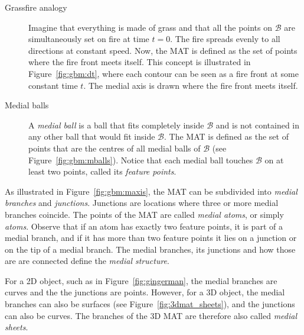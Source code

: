 \begin{description}
	\item[Grassfire analogy]
	Imagine that everything is made of grass and that all the points on $\mathcal{B}$ are simultaneously set on fire at time $t=0$. 
	The fire spreads evenly to all directions at constant speed. 
	Now, the MAT is defined as the set of points where the fire front meets itself. 
	This concept is illustrated in Figure~\ref{fig:gbm:dt}, where each contour can be seen as a fire front at some constant time $t$. The medial axis is drawn where the fire front meets itself.
	\item[Medial balls]
	A \emph{medial ball} is a ball that fits completely inside $\mathcal{B}$ and is not contained in any other ball that would fit inside $\mathcal{B}$. 
	The MAT is defined as the set of points that are the centres of all medial balls of $\mathcal{B}$ (see Figure~\ref{fig:gbm:mballs}). 
	Notice that each medial ball touches $\mathcal{B}$ on at least two points, called its \emph{feature points}. 
\end{description}

As illustrated in Figure~\ref{fig:gbm:maxis}, the MAT can be subdivided into \emph{medial branches} and \emph{junctions}. 
Junctions are locations where three or more medial branches coincide. 
The points of the MAT are called \emph{medial atoms}, or simply \emph{atoms}. 
Observe that if an atom has exactly two feature points, it is part of a medial branch, and if it has more than two feature points it lies on a junction or on the tip of a medial branch. 
The medial branches, its junctions and how those are are connected define the \emph{medial structure}.

For a 2D object, such as in Figure~\ref{fig:gingerman}, the medial branches are curves and the the junctions are points. 
However, for a 3D object, the medial branches can also be surfaces (see Figure~\ref{fig:3dmat_sheets}), and the junctions can also be curves.
The branches of the 3D MAT are therefore also called \emph{medial sheets}.

